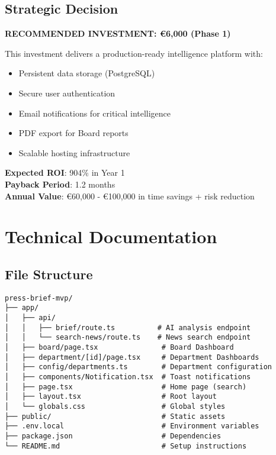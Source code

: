 \documentclass[11pt,a4paper]{article}
\begin{document}
\subsection{Strategic Decision}

\begin{tcolorbox}[colback=blue!5!white,colframe=andrianiblue,width=\textwidth,arc=3mm,boxrule=2pt]
\textbf{RECOMMENDED INVESTMENT: \euro 6,000 (Phase 1)}

\vspace{0.3cm}
This investment delivers a production-ready intelligence platform with:
\begin{itemize}[nosep]
    \item Persistent data storage (PostgreSQL)
    \item Secure user authentication
    \item Email notifications for critical intelligence
    \item PDF export for Board reports
    \item Scalable hosting infrastructure
\end{itemize}

\vspace{0.3cm}
\textbf{Expected ROI}: 904\% in Year 1\\
\textbf{Payback Period}: 1.2 months\\
\textbf{Annual Value}: \euro 60,000 - \euro 100,000 in time savings + risk reduction
\end{tcolorbox}

\section{Technical Documentation}

\subsection{File Structure}
\begin{verbatim}
press-brief-mvp/
├── app/
│   ├── api/
│   │   ├── brief/route.ts          # AI analysis endpoint
│   │   └── search-news/route.ts    # News search endpoint
│   ├── board/page.tsx               # Board Dashboard
│   ├── department/[id]/page.tsx     # Department Dashboards
│   ├── config/departments.ts        # Department configuration
│   ├── components/Notification.tsx  # Toast notifications
│   ├── page.tsx                     # Home page (search)
│   ├── layout.tsx                   # Root layout
│   └── globals.css                  # Global styles
├── public/                          # Static assets
├── .env.local                       # Environment variables
├── package.json                     # Dependencies
└── README.md                        # Setup instructions
\end{verbatim}
\end{document}
